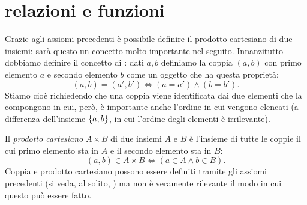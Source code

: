\begin{comment}
\section{numeri naturali}
%
La teoria degli insiemi prevede che ogni ``oggetto''
sia in effetti un insieme.
Possiamo ad esempio definire i numeri naturali partendo dall'insieme
vuoto e costruendo insiemi di insiemi, così:
\begin{align*}
  0 = \emptyset, \qquad
  1 = \ENCLOSE{0}, \qquad
  2 = \ENCLOSE{0,1}, \qquad
  3 = \ENCLOSE{0,1,2}, \qquad
  4 = \ENCLOSE{0,1,2,3}, \\
  5 = \ENCLOSE{0,1,2,3,4}, \qquad
  6 = \ENCLOSE{0,1,2,3,4,5}, \qquad
  7 = \ENCLOSE{0,1,2,3,4,5,6}, \\
  8 = \ENCLOSE{0,1,2,3,4,5,6,7}, \qquad
  9 = \ENCLOSE{0,1,2,3,4,5,6,7,8}.
\end{align*}
Risulta quindi che l'$n$-esimo numero naturale coincide
con l'insieme dei primi $n$ numeri naturali.
Ovviamente potremmo andare avanti: se $n$ è un numero naturale
il successivo non è altro che $n\cup \ENCLOSE{n}$.
\end{comment}

\section{relazioni e funzioni}

Grazie agli assiomi precedenti è possibile definire il prodotto cartesiano
di due insiemi: sarà questo un concetto molto importante nel seguito.
Innanzitutto dobbiamo definire il concetto di : dati
$a,b$ definiamo la coppia $(a,b)$ con primo elemento $a$ e secondo elemento $b$
come un oggetto che ha questa proprietà:
\[
  (a, b) = (a', b') \iff (a=a') \land (b=b').
\]
Stiamo cioè richiedendo che una coppia viene identificata dai due
elementi che la compongono in cui, però, è importante anche l'ordine in
cui vengono elencati (a differenza dell'insieme ${\left\{ a,b \right\}}$, in cui
l'ordine degli elementi è irrilevante).

Il \emph{prodotto cartesiano} $A\times B$ di due insiemi $A$ e $B$
è l'insieme di tutte le coppie il cui primo elemento sta in $A$ e
il secondo elemento sta in $B$:
\[
  (a, b) \in A \times B \iff (a\in A \land b\in B).
\]
Coppia e prodotto cartesiano possono essere definiti tramite gli
assiomi precedenti (si veda, al solito, \cite{appunti_logica})
ma non è veramente rilevante il modo in cui questo può essere fatto.

